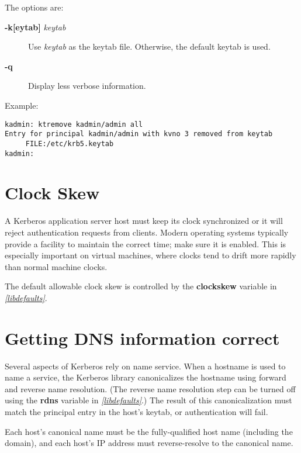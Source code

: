 \documentclass[letterpaper,10pt,english]{sphinxmanual}
\begin{document}
The options are:
\begin{description}
\item[{\textbf{-k{[}eytab{]}} \emph{keytab}}] \leavevmode
Use \emph{keytab} as the keytab file.  Otherwise, the default keytab is
used.

\item[{\textbf{-q}}] \leavevmode
Display less verbose information.

\end{description}

Example:

\begin{Verbatim}[commandchars=\\\{\}]
kadmin: ktremove kadmin/admin all
Entry for principal kadmin/admin with kvno 3 removed from keytab
     FILE:/etc/krb5.keytab
kadmin:
\end{Verbatim}


\section{Clock Skew}
\label{admin/appl_servers:clock-skew}
A Kerberos application server host must keep its clock synchronized or
it will reject authentication requests from clients.  Modern operating
systems typically provide a facility to maintain the correct time;
make sure it is enabled.  This is especially important on virtual
machines, where clocks tend to drift more rapidly than normal machine
clocks.

The default allowable clock skew is controlled by the \textbf{clockskew}
variable in {\hyperref[admin/conf_files/krb5_conf:libdefaults]{\emph{{[}libdefaults{]}}}}.


\section{Getting DNS information correct}
\label{admin/appl_servers:getting-dns-information-correct}
Several aspects of Kerberos rely on name service.  When a hostname is
used to name a service, the Kerberos library canonicalizes the
hostname using forward and reverse name resolution.  (The reverse name
resolution step can be turned off using the \textbf{rdns} variable in
{\hyperref[admin/conf_files/krb5_conf:libdefaults]{\emph{{[}libdefaults{]}}}}.)  The result of this canonicalization must match
the principal entry in the host's keytab, or authentication will fail.

Each host's canonical name must be the fully-qualified host name
(including the domain), and each host's IP address must
reverse-resolve to the canonical name.
\end{document}
